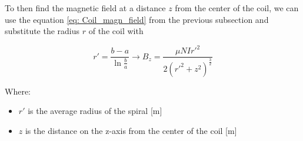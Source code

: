 \begin{samepage}
    To then find the magnetic field at a distance $z$ from the center of the coil, we can use the equation \ref{eq: Coil_magn_field} from the previous subsection and substitute the radius $r$ of the coil with
    \nopagebreak  

    \begin{equation}
        r' = \frac{b-a}{\ln\frac{b}{a}} \rightarrow B_z = \frac{\mu N I r'^2}{2(r'^2+z^2)^\frac{3}{2}} 
        \label{eq: Spiral_magn_field_dist}
    \end{equation}
    \nopagebreak

    Where:
    \begin{itemize}
        \item $r'$ is the average radius of the spiral [m]
        \item $z$ is the distance on the z-axis from the center of the coil [m]
    \end{itemize}
\end{samepage}

